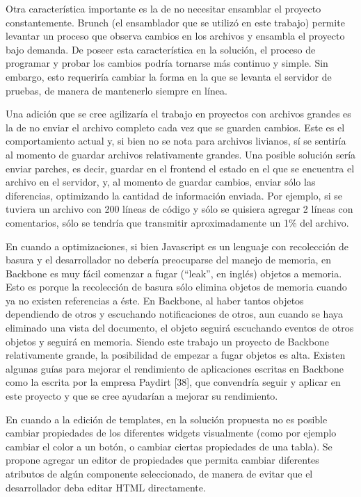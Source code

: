 \documentclass[12pt,spanish,letter]{report}
\begin{document}
Otra característica importante es la de no necesitar ensamblar el
proyecto constantemente. Brunch (el ensamblador que se utilizó en este
trabajo) permite levantar un proceso que observa cambios en los archivos
y ensambla el proyecto bajo demanda. De poseer esta característica en la
solución, el proceso de programar y probar los cambios podría tornarse
más continuo y simple. Sin embargo, esto requeriría cambiar la forma en
la que se levanta el servidor de pruebas, de manera de mantenerlo
siempre en línea.

Una adición que se cree agilizaría el trabajo en proyectos con archivos
grandes es la de no enviar el archivo completo cada vez que se guarden
cambios. Este es el comportamiento actual y, si bien no se nota para
archivos livianos, sí se sentiría al momento de guardar archivos
relativamente grandes. Una posible solución sería enviar parches, es
decir, guardar en el frontend el estado en el que se encuentra el
archivo en el servidor, y, al momento de guardar cambios, enviar sólo
las diferencias, optimizando la cantidad de información enviada. Por
ejemplo, si se tuviera un archivo con 200 líneas de código y sólo se
quisiera agregar 2 líneas con comentarios, sólo se tendría que
transmitir aproximadamente un 1\% del archivo.

En cuando a optimizaciones, si bien Javascript es un lenguaje con
recolección de basura y el desarrollador no debería preocuparse del
manejo de memoria, en Backbone es muy fácil comenzar a fugar (``leak'',
en inglés) objetos a memoria. Esto es porque la recolección de basura
sólo elimina objetos de memoria cuando ya no existen referencias a éste.
En Backbone, al haber tantos objetos dependiendo de otros y escuchando
notificaciones de otros, aun cuando se haya eliminado una vista del
documento, el objeto seguirá escuchando eventos de otros objetos y
seguirá en memoria. Siendo este trabajo un proyecto de Backbone
relativamente grande, la posibilidad de empezar a fugar objetos es alta.
Existen algunas guías para mejorar el rendimiento de aplicaciones
escritas en Backbone como la escrita por la empresa Paydirt {[}38{]},
que convendría seguir y aplicar en este proyecto y que se cree ayudarían
a mejorar su rendimiento.

En cuando a la edición de templates, en la solución propuesta no es
posible cambiar propiedades de los diferentes widgets visualmente (como
por ejemplo cambiar el color a un botón, o cambiar ciertas propiedades
de una tabla). Se propone agregar un editor de propiedades que permita
cambiar diferentes atributos de algún componente seleccionado, de manera
de evitar que el desarrollador deba editar HTML directamente.
\end{document}
